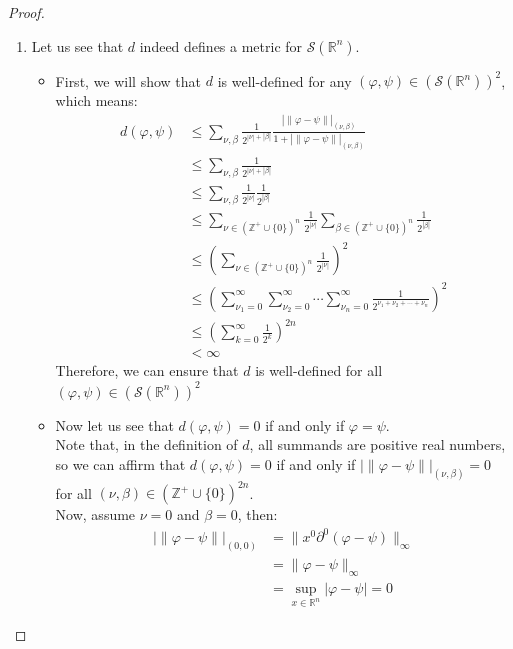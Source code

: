 \begin{proof}{}
	\begin{enumerate}
		\item Let us see that $d$ indeed defines a metric for $\mathcal{S}(\mathbb{R}^n)$.\\
		  \begin{itemize}
			  \item First, we will show that $d$ is well-defined for any $(\varphi,\psi)\in (\mathcal{S}(\mathbb{R}^n))^2$, which means:
			    \begin{align*}
				    d(\varphi,\psi)&\leq\sum_{\nu,\beta}\frac{1}{2^{|\nu|+|\beta|}}\frac{|\|\varphi-\psi\||_{(\nu,\beta)}}{1+|\|\varphi-\psi\||_{(\nu,\beta)}}\\
				    &\leq \sum_{\nu,\beta}\frac{1}{2^{|\nu|+|\beta|}}\\
				    &\leq \sum_{\nu,\beta}\frac{1}{2^{|\nu|}}\frac{1}{2^{|\beta|}}\\
				    &\leq \sum_{\nu\in(\mathbb{Z}^+\cup\{0\})^n}\frac{1}{2^{|\nu|}} \sum_{\beta\in(\mathbb{Z}^+\cup\{0\})^n}\frac{1}{2^{|\beta|}}\\
				    &\leq \left(\sum_{\nu\in(\mathbb{Z}^+\cup\{0\})^n}\frac{1}{2^{|\nu|}}\right)^2\\
				    &\leq\left( \sum_{\nu_1=0}^{\infty}\sum_{\nu_2=0}^{\infty}\cdots\sum_{\nu_n=0}^{\infty}\frac{1}{2^{\nu_1+\nu_2+\cdots+\nu_n}}\right)^2\\
				    &\leq\left(\sum_{k=0}^{\infty}\frac{1}{2^k}\right)^{2n}\\
				    &<\infty
			    \end{align*}
			    Therefore, we can ensure that $d$ is well-defined for all $(\varphi,\psi)\in(\mathcal{S}(\mathbb{R}^n))^2$\\
			  \item Now let us see that $d(\varphi,\psi)=0$ if and only if $\varphi=\psi$.\\
			    Note that, in the definition of $d$, all summands are positive real numbers, so we can affirm that $d(\varphi,\psi)=0$ if and only if $|\|\varphi-\psi\||_{(\nu,\beta)}=0$ for all $(\nu,\beta)\in(\mathbb{Z}^+\cup \{0\})^{2n}$.\\
			    Now, assume $\nu=0$ and $\beta=0$, then:
			    \begin{align*}
				    |\|\varphi-\psi\||_{(0,0)}&=\|x^{0}\partial^{0}(\varphi-\psi)\|_{\infty}\\
				    &=\|\varphi-\psi\|_{\infty}\\
				    &=\sup_{x\in\mathbb{R}^n}|\varphi-\psi|=0

\end{align*}
\end{itemize}
\end{enumerate}
\end{proof}
